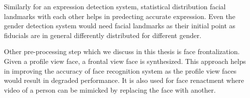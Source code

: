 Similarly for an expression 
detection system, statistical distribution facial landmarks with each other helps in predecting 
accurate expression. Even the gender detection system would need facial landmarks as their initial 
point as fiducials are in general differently distributed for different gender.


Other pre-processing step which we discuss in this thesis is face frontalization. Given a profile
view face, a frontal view face is synthesized. This approach helps in improving the accuracy of 
face recognition system as the profile view faces would result in degraded performance. It is
also used for face renactment where video of a person can be mimicked by replacing the face with
another.
